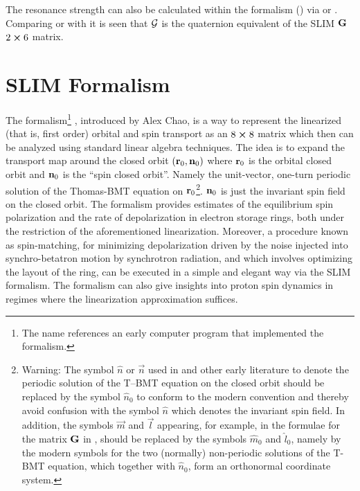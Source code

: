 The resonance strength can also be calculated within the  formalism () via
 or . Comparing  or  with  it is seen
that $\bf{\cal G}$ is the quaternion equivalent of the SLIM ${\bf G}$ $2\mathbin{\boldsymbol{\times}}6$ matrix.

\section{SLIM Formalism}
\label{s:slim}

The  formalism\footnote
  {
The name references an early computer program that implemented the formalism.
  }
\cite{b:chao.spin,b:barber99}, introduced by Alex Chao, is a way to represent the linearized (that
is, first order) orbital and spin transport as an $8 \mathbin{\boldsymbol{\times}} 8$ matrix which then can be analyzed
using standard linear algebra techniques. The idea is to expand the transport map around the closed
orbit $({\bf r}_0, {\bf n}_0)$ where ${\bf r}_0$ is the orbital closed orbit and ${\bf n}_0$ is the ``spin
closed orbit''. Namely the unit-vector, one-turn periodic solution of the Thomas-BMT equation on
${\bf r}_0$\footnote
  {
Warning: The symbol $\hat n$ or
$\vec n$ used in \cite{b:chao.spin,b:barber85} and other early literature to denote the periodic
solution of the T--BMT equation on the closed orbit should be replaced by the symbol $\hat n_0$ to
conform to the modern convention \cite{b:barber99} and thereby avoid confusion with the symbol $\hat
n$ which denotes the invariant spin field.  In addition, the symbols $\vec m$ and $\vec l$
appearing, for example, in the formulae for the matrix ${\bf G}$ in \cite{b:barber85}, should be
replaced by the symbols $\hat m_0$ and $\hat l_0$, namely by the modern symbols for the two
(normally) non-periodic solutions of the T-BMT equation, which together with $\hat n_0$, form an
orthonormal coordinate system.
  }.
% 
${\bf n}_0$ is just the invariant spin field on the closed orbit. The formalism provides estimates of
the equilibrium spin polarization and the rate of depolarization in electron storage rings, both
under the restriction of the aforementioned linearization. Moreover, a procedure known as
spin-matching, for minimizing depolarization driven by the noise injected into synchro-betatron
motion by synchrotron radiation, and which involves optimizing the layout of the ring, can be
executed in a simple and elegant way via the SLIM formalism. The formalism can also give insights
into proton spin dynamics in regimes where the linearization approximation suffices.

